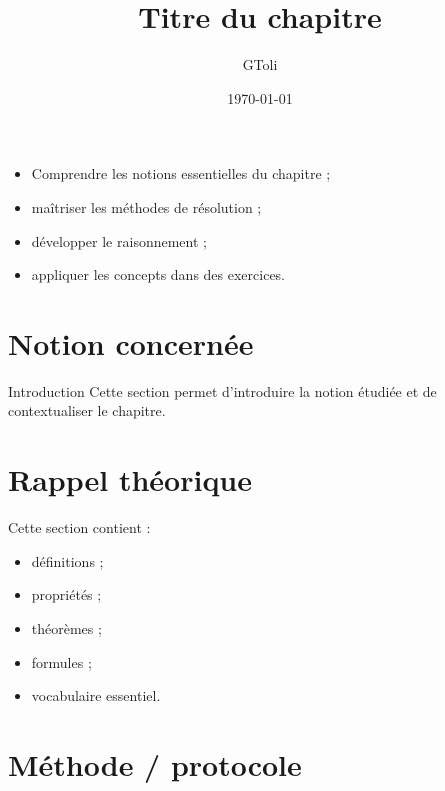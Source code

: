 \documentclass[11pt,a4paper]{article}
\title{\textbf{Titre du chapitre}}
\author{GToli}
\date{\today}
\begin{document}
\maketitle


\begin{cadreobjectif}
\begin{itemize}
    \item Comprendre les notions essentielles du chapitre ;
    \item maîtriser les méthodes de résolution ;
    \item développer le raisonnement ;
    \item appliquer les concepts dans des exercices.
\end{itemize}
\end{cadreobjectif}

\section{Notion concernée}

\begin{cadrebleu}{Introduction}
Cette section permet d’introduire la notion étudiée et de contextualiser le chapitre.
\end{cadrebleu}

\section{Rappel théorique}

\begin{cadretheorie}
Cette section contient :
\begin{itemize}
    \item définitions ;
    \item propriétés ;
    \item théorèmes ;
    \item formules ;
    \item vocabulaire essentiel.
\end{itemize}
\end{cadretheorie}

\section{Méthode / protocole}
\end{document}
